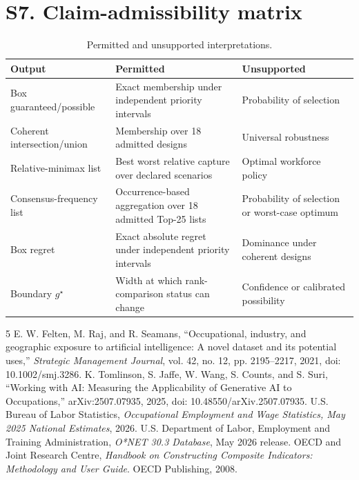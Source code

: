 \documentclass[10pt]{article}
\begin{document}
\section*{S7. Claim-admissibility matrix}
\begin{table}[h]\centering\small
\caption{Permitted and unsupported interpretations.}
\begin{tabular}{p{}p{}p{}}\toprule Output&Permitted&Unsupported\\\midrule
Box guaranteed/possible&Exact membership under independent priority intervals&Probability of selection\\
Coherent intersection/union&Membership over 18 admitted designs&Universal robustness\\
Relative-minimax list&Best worst relative capture over declared scenarios&Optimal workforce policy\\
Consensus-frequency list&Occurrence-based aggregation over 18 admitted Top-25 lists&Probability of selection or worst-case optimum\\
Box regret&Exact absolute regret under independent priority intervals&Dominance under coherent designs\\
Boundary $g^\star$&Width at which rank-comparison status can change&Confidence or calibrated possibility\\\bottomrule\end{tabular}
\end{table}

\begin{thebibliography}{5}\small
{} E. W. Felten, M. Raj, and R. Seamans, ``Occupational, industry, and geographic exposure to artificial intelligence: A novel dataset and its potential uses,'' \emph{Strategic Management Journal}, vol. 42, no. 12, pp. 2195--2217, 2021, doi: 10.1002/smj.3286.
 K. Tomlinson, S. Jaffe, W. Wang, S. Counts, and S. Suri, ``Working with AI: Measuring the Applicability of Generative AI to Occupations,'' arXiv:2507.07935, 2025, doi: 10.48550/arXiv.2507.07935.
 U.S. Bureau of Labor Statistics, \emph{Occupational Employment and Wage Statistics, May 2025 National Estimates}, 2026.
 U.S. Department of Labor, Employment and Training Administration, \emph{O*NET 30.3 Database}, May 2026 release.
 OECD and Joint Research Centre, \emph{Handbook on Constructing Composite Indicators: Methodology and User Guide}. OECD Publishing, 2008.
\end{thebibliography}
\end{document}
